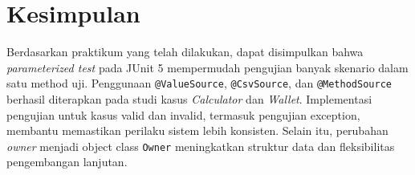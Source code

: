 \documentclass[a4paper,oneside,12pt]{report}
\begin{document}
\clearpage
\chapter{Kesimpulan}
Berdasarkan praktikum yang telah dilakukan, dapat disimpulkan bahwa \textit{parameterized test} pada JUnit 5 mempermudah pengujian banyak skenario dalam satu method uji. Penggunaan \texttt{@ValueSource}, \texttt{@CsvSource}, dan \texttt{@MethodSource} berhasil diterapkan pada studi kasus \textit{Calculator} dan \textit{Wallet}. Implementasi pengujian untuk kasus valid dan invalid, termasuk pengujian exception, membantu memastikan perilaku sistem lebih konsisten. Selain itu, perubahan \textit{owner} menjadi object class \texttt{Owner} meningkatkan struktur data dan fleksibilitas pengembangan lanjutan.

\clearpage
\end{document}
